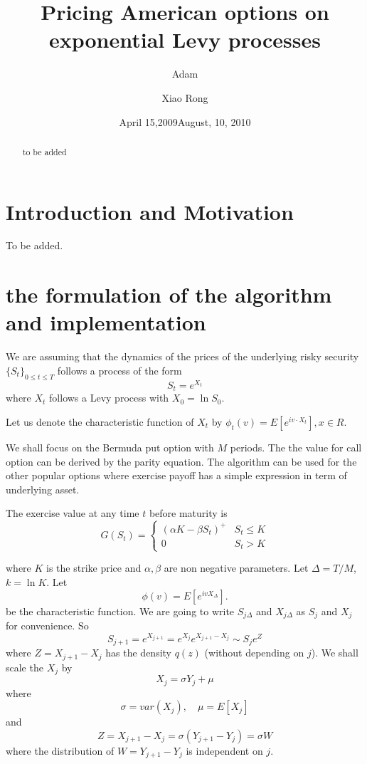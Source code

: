 \documentclass[numreferences]{kluwer}    %
\begin{document}
\begin{article}
\begin{opening}
\date{April 15,2009}
\title{Pricing American options on exponential Levy processes}

\author{Adam }
\author{Xiao Rong }

\date{August, 10, 2010}
 
\begin{abstract}
to be added
\end{abstract}
\end{opening}
\section{Introduction and Motivation}\label{intro}
To be added.
\section{the formulation of the algorithm and implementation}
We are assuming that the dynamics of the prices of the underlying
risky security $\{S_t\}_{0\le t\le T}$ follows a process of the form
\[
S_t=e^{X_t}
\]
where $X_t$ follows a Levy process with $X_0=\ln S_0$.


Let us denote the characteristic function of $X_t$ by $\phi_t(v)=
E[e^{iv\cdot X_t}], x\in R$.

We shall focus on the Bermuda put option with $M$ periods. The the
value for call option can be derived by the parity equation. The
algorithm can be used for the other popular options where exercise
payoff has a simple expression in term of underlying asset.

The exercise value at any time $t$ before maturity is
\[
G(S_t)=\left\{\begin{array}{cc}
         (\alpha K-\beta S_t)^+ & S_t\le K \\
         0 & S_t> K
       \end{array}\right.
\]

where $K$ is the strike price and $\alpha,\beta$ are non negative
parameters. Let $\Delta=T/M$, $k=\ln K$. Let
\[
\phi(v)=E[e^{ivX_{\Delta}}].
\]
be the characteristic function. We are going to write $S_{j\Delta}$
and $X_{j\Delta}$ as $S_j$ and $X_j$ for convenience. So
\[
S_{j+1}=e^{X_{j+1}}=e^{X_j}e^{X_{j+1}-X_j} \sim S_je^{Z}
\]
where $Z=X_{j+1}-X_j$ has the density $q(z)$ (without depending on
$j$). We shall scale the $X_j$ by
\[
X_j=\sigma Y_j+\mu
\]
where
\[
\sigma = var(X_j),\quad \mu=E[X_j]
\]
and
\[
Z=X_{j+1}-X_j=\sigma(Y_{j+1}-Y_j)=\sigma W
\]
where the distribution of $W=Y_{j+1}-Y_j$ is independent on $j$.


\end{article}
\end{document}
